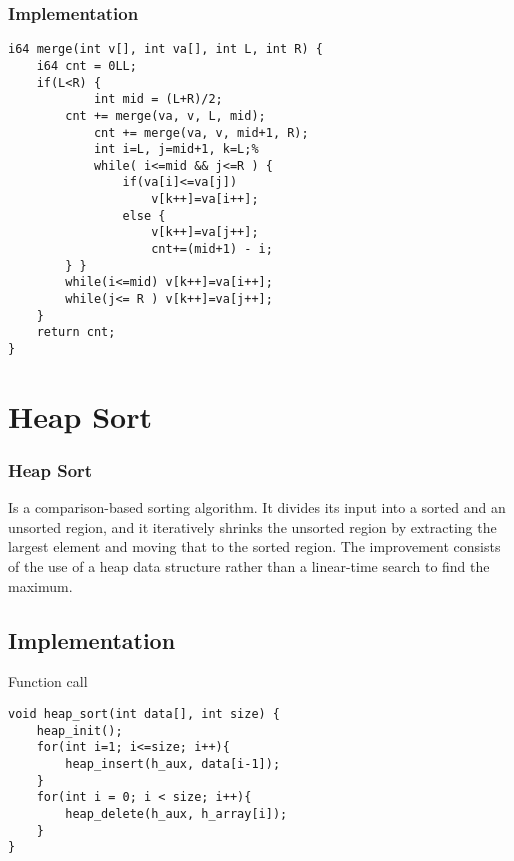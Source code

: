 \documentclass{beamer}
\begin{document}
\begin{frame}[fragile]
\frametitle{ Implementation }

\begin{lstlisting}
i64 merge(int v[], int va[], int L, int R) {
    i64 cnt = 0LL;
    if(L<R) {
        	int mid = (L+R)/2;
        cnt += merge(va, v, L, mid);
        	cnt += merge(va, v, mid+1, R);
        	int i=L, j=mid+1, k=L;%
        	while( i<=mid && j<=R ) {
            	if(va[i]<=va[j])
                	v[k++]=va[i++];
            	else {
                	v[k++]=va[j++];
                	cnt+=(mid+1) - i;
        } }
        while(i<=mid) v[k++]=va[i++];
        while(j<= R ) v[k++]=va[j++];
    }
    return cnt;
}
\end{lstlisting}

\end{frame}



\section{Heap Sort} 

\begin{frame}[fragile]

\frametitle{Heap Sort}

Is a comparison-based sorting algorithm. It divides its input into a sorted and an unsorted region, and it iteratively shrinks the unsorted region by extracting the largest element and moving that to the sorted region. The improvement consists of the use of a heap data structure rather than a linear-time search to find the maximum.

\subsection{Implementation}
\begin{block}{Function call}
\begin{lstlisting}
void heap_sort(int data[], int size) {
    heap_init();
    for(int i=1; i<=size; i++){
        heap_insert(h_aux, data[i-1]);
    }
    for(int i = 0; i < size; i++){
        heap_delete(h_aux, h_array[i]);
    }
}
\end{lstlisting}
\end{block}

\end{frame}
\end{document}
